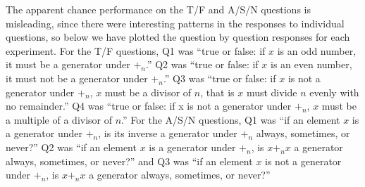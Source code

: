 \documentclass[man,10pt]{apa6}
\begin{document}
The apparent chance performance on the T/F and A/S/N questions is misleading, since there were interesting patterns in the responses to individual questions, so below we have plotted the question by question responses for each experiment. For the T/F questions, Q1 was ``true or false: if $x$ is an odd number, it must be a generator under $+_n$.'' Q2 was ``true or false: if $x$ is an even number, it must not be a generator under $+_n$.'' Q3 was ``true or false: if $x$ is not a generator under $+_n$, $x$ must be a divisor of $n$, that is $x$ must divide $n$ evenly with no remainder.'' Q4 was ``true or false: if x is not a generator under $+_n$, $x$ must be a multiple of a divisor of $n$.'' For the A/S/N questions, Q1 was ``if an element $x$ is a generator under $+_n$, is its inverse a generator under $+_n$ always, sometimes, or never?'' Q2 was ``if an element $x$ is a generator under $+_n$, is $x+_nx$ a generator always, sometimes, or never?'' and Q3 was ``if an element $x$ is not a generator under $+_n$, is $x +_n x$ a generator always, sometimes, or never?''
\end{document}
